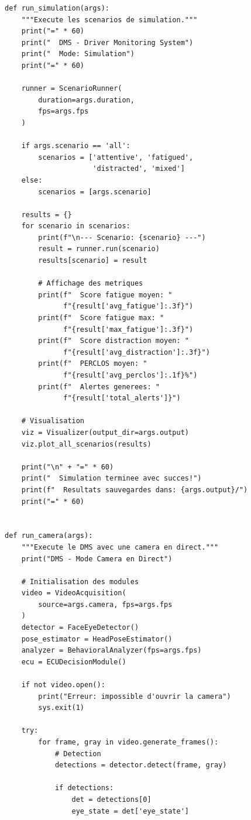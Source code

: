 \begin{lstlisting}[style=pythonstyle, caption={Point d'entrée principal du système DMS.}, label={lst:main}]
def run_simulation(args):
    """Execute les scenarios de simulation."""
    print("=" * 60)
    print("  DMS - Driver Monitoring System")
    print("  Mode: Simulation")
    print("=" * 60)
    
    runner = ScenarioRunner(
        duration=args.duration,
        fps=args.fps
    )
    
    if args.scenario == 'all':
        scenarios = ['attentive', 'fatigued', 
                     'distracted', 'mixed']
    else:
        scenarios = [args.scenario]
    
    results = {}
    for scenario in scenarios:
        print(f"\n--- Scenario: {scenario} ---")
        result = runner.run(scenario)
        results[scenario] = result
        
        # Affichage des metriques
        print(f"  Score fatigue moyen: "
              f"{result['avg_fatigue']:.3f}")
        print(f"  Score fatigue max: "
              f"{result['max_fatigue']:.3f}")
        print(f"  Score distraction moyen: "
              f"{result['avg_distraction']:.3f}")
        print(f"  PERCLOS moyen: "
              f"{result['avg_perclos']:.1f}%")
        print(f"  Alertes generees: "
              f"{result['total_alerts']}")
    
    # Visualisation
    viz = Visualizer(output_dir=args.output)
    viz.plot_all_scenarios(results)
    
    print("\n" + "=" * 60)
    print("  Simulation terminee avec succes!")
    print(f"  Resultats sauvegardes dans: {args.output}/")
    print("=" * 60)


def run_camera(args):
    """Execute le DMS avec une camera en direct."""
    print("DMS - Mode Camera en Direct")
    
    # Initialisation des modules
    video = VideoAcquisition(
        source=args.camera, fps=args.fps
    )
    detector = FaceEyeDetector()
    pose_estimator = HeadPoseEstimator()
    analyzer = BehavioralAnalyzer(fps=args.fps)
    ecu = ECUDecisionModule()
    
    if not video.open():
        print("Erreur: impossible d'ouvrir la camera")
        sys.exit(1)
    
    try:
        for frame, gray in video.generate_frames():
            # Detection
            detections = detector.detect(frame, gray)
            
            if detections:
                det = detections[0]
                eye_state = det['eye_state']
                

\end{lstlisting}
